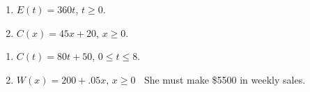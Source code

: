 \begin{multicols}{2}
\begin{enumerate}
\setcounter{enumi}{\value{HW}}

\item  $E(t) = 360t$, $t \geq 0$.
\item  $C(x) = 45x+20$, $x \geq 0$.

\setcounter{HW}{\value{enumi}}
\end{enumerate}
\end{multicols}

\begin{multicols}{2}
\begin{enumerate}
\setcounter{enumi}{\value{HW}}

\item  $C(t) = 80t + 50$,  $0 \leq t \leq 8$.
\item  $W(x) = 200 + .05x,\, x \geq 0\;\;$ She must make \$5500 in weekly sales.

\setcounter{HW}{\value{enumi}}
\end{enumerate}
\end{multicols}

